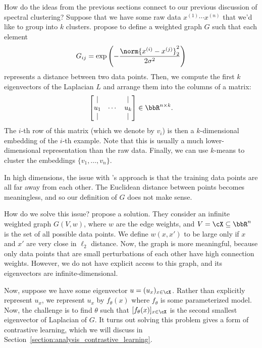 How do the ideas from the previous sections connect to our previous discussion of spectral clustering? Suppose that we have some raw data $x^{(1)} \cdots x^{(n)}$ that we'd like to group into $k$ clusters. \citet{ng2001spectral} propose to define a weighted graph $G$ such that each element 
\begin{equation}
    G_{ij} = \exp \left( -\frac{\norm{x^{(i)} - x^{(j)}}^2_2}{2\sigma^2} \right)
\end{equation}
represents a distance between two data points. Then, we compute the first $k$ eigenvectors of the Laplacian $L$ and arrange them into the columns of a matrix: 
\begin{equation}
    \begin{bmatrix} \lvert &  & \lvert \\ u_1 & \cdots &  u_k \\ \lvert &  & \lvert \end{bmatrix} \in \bbR^{n \times k}.
\end{equation} 
The $i$-th row of this matrix (which we denote by $v_i$) is then a $k$-dimensional embedding of the $i$-th example. Note that this is usually a much lower-dimensional representation than the raw data. Finally, we can use $k$-means to cluster the embeddings $\{v_1,\dots,v_n\}$.

In high dimensions, the issue with \citet{ng2001spectral}'s approach is that the training data points are all far away from each other. The Euclidean distance between points becomes meaningless, and so our definition of $G$ does not make sense. 

How do we solve this issue? \citet{haochen2021provable} propose a solution. They consider an infinite weighted graph $G(V, w)$, where $w$ are the edge weights, and $V = \cX \subseteq \bbR^n$ is the set of all possible data points. We define $w(x, x')$ to be large only if $x$ and $x'$ are very close in $\ell_2$ distance. Now, the graph is more meaningful, because only data points that are small perturbations of each other have high connection weights. However, we do not have explicit access to this graph, and its eigenvectors are infinite-dimensional. 

Now, suppose we have some eigenvector $u = (u_x)_{x \in \cX} $. Rather than explicitly represent $u_x$, we represent $u_x$ by $f_\theta(x)$ where $f_\theta$ is some parameterized model. Now, the challenge is to find $\theta$ such that $[f_\theta(x)]_{x \in \cX}$ is the second smallest eigenvector of Laplacian of $G$. It turns out solving this problem gives a form of contrastive learning, which we will discuss in Section~\ref{section:analysis_contrastive_learning}.

